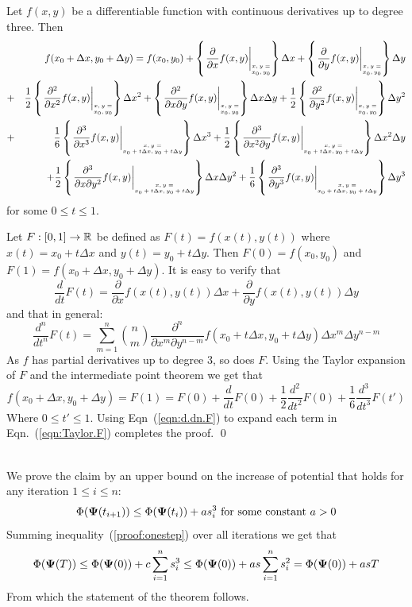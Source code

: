 \documentclass{article}[12pt]
\begin{document}
\newcommand{\Dx}{\Delta x}
\newcommand{\Dy}{\Delta y}
\begin{lemma} \label{lemma:Taylor2D}
Let $f(x,y)$ be a differentiable function with continuous derivatives
up to degree three. Then
\begin{eqnarray}
  &&f(x_0+\Dx,y_0+\Dy) = f(x_0,y_0)
  + \atI{\frac{\partial}{\partial x}} \Dx 
  + \atI{\frac{\partial}{\partial y}} \Dy \\
  &+&\frac{1}{2} \atI{\frac{\partial^2}{\partial x^2}} \Dx^2
      +\atI{\frac{\partial^2}{\partial x\partial y}} \Dx\Dy
      +\frac{1}{2} \atI{\frac{\partial^2}{\partial y^2}} \Dy^2\\
  &+&\frac{1}{6} \atII{\frac{\partial^3}{\partial x^3}} \Dx^3
      +\frac{1}{2} \atII{\frac{\partial^3}{\partial x^2 \partial y}} \Dx^2\Dy\\
  &&+ \frac{1}{2} \atII{\frac{\partial^3}{\partial x \partial y^2}} \Dx\Dy^2
    + \frac{1}{6} \atII{\frac{\partial^3}{\partial y^3}} \Dy^3
\end{eqnarray}
for some $0\leq t \leq 1$.
\end{lemma}
Let $F:[0,1] \to \mathbb{R}$ be defined as  $F(t)=f(x(t),y(t))$ where
$x(t) = x_0+t\Dx$ and $y(t)=y_0+t\Dy$. Then $F(0)=f(x_0,y_0)$ and
$F(1)=f(x_0+\Dx,y_0+\Dy)$. It is easy to verify that
$$ \frac{d}{dt}F(t)
=\frac{\partial}{\partial x} f(x(t),y(t))\Dx
+ \frac{\partial}{\partial y} f(x(t),y(t))\Dy
$$
and that in general:
\begin{equation} \label{eqn:d.dn.F}
\frac{d^n}{d t^n} F(t) = \sum_{m=1}^n {n \choose m}
\frac{\partial^n}{\partial x^m \partial y^{n-m}} f(x_0+t \Dx,y_0+t\Dy)
\Dx^m \Dy^{n-m}
\end{equation}
As $f$ has partial derivatives up to degree 3, so does $F$. Using the
Taylor expansion of $F$ and the intermediate point theorem we get that
\begin{equation} \label{eqn:Taylor.F}
  f(x_0+\Dx,y_0+\Dy) = F(1) = F(0)+\frac{d}{dt}F(0)
  +\frac{1}{2}\frac{d^2}{dt^2}F(0)
  +\frac{1}{6}\frac{d^3}{dt^3}F(t')
\end{equation}
Where $0 \leq t' \leq 1$. Using Eqn~(\ref{eqn:d.dn.F}) to expand each
term in Eqn.~(\ref{eqn:Taylor.F}) completes the proof.
\qed


\\
We prove the claim by an upper bound on the increase of potential that holds for any iteration $1 \leq i \leq n$:
\begin{equation} \label{proof:onestep}
\Phi({\bf \Psi}(t_{i+1})) \leq \Phi({\bf \Psi}(t_i)) + a s_i^3 \mbox{ for some constant } a>0
\end{equation}
Summing inequality~(\ref{proof:onestep}) over all iterations we get that 
\begin{equation} \label{proof:allsteps}
\Phi({\bf \Psi}(T)) \leq \Phi({\bf \Psi}(0)) + c \sum_{i=1}^n s_i^3 \leq 
\Phi({\bf \Psi}(0)) + a s \sum_{i=1}^n s_i^2 = 
\Phi({\bf \Psi}(0)) + a s T
\end{equation}
From which the statement of the theorem follows.
\end{document}
